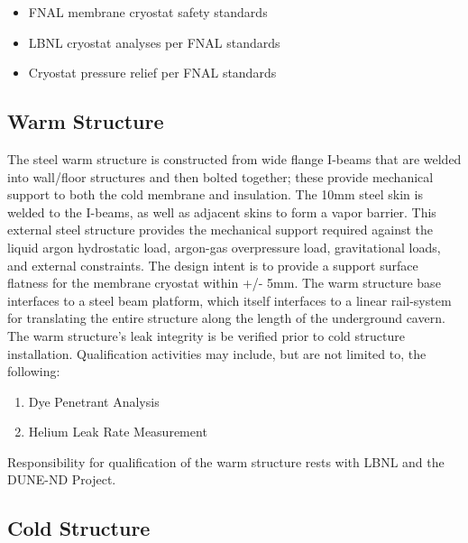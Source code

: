 \begin{itemize}
\item FNAL membrane cryostat safety standards
\item LBNL cryostat analyses per FNAL standards
\item Cryostat pressure relief per FNAL standards
\end{itemize}


\subsection{Warm Structure}
\label{sec:cryost-des-warm}
The steel warm structure is constructed from wide flange I-beams that are welded into wall/floor structures and then bolted together; these provide mechanical support to both the cold membrane and insulation.  The 10mm steel skin is welded to the I-beams, as well as adjacent skins to form a vapor barrier.  This external steel structure provides the mechanical support required against the liquid argon hydrostatic load, argon-gas overpressure load, gravitational loads, and external constraints. The design intent is to provide a support surface flatness for the membrane cryostat within +/- 5mm.
The warm structure base interfaces to a steel beam platform, which itself interfaces to a linear rail-system for translating the entire structure along the length of the underground cavern.
The warm structure’s leak integrity is be verified prior to cold structure installation.  Qualification activities may include, but are not limited to, the following:
\begin{enumerate}
    \item Dye Penetrant Analysis
    \item Helium Leak Rate Measurement 
\end{enumerate}
Responsibility for qualification of the warm structure rests with LBNL and the DUNE-ND Project.


\subsection{Cold Structure}
\label{sec:cryost-des-cold}
